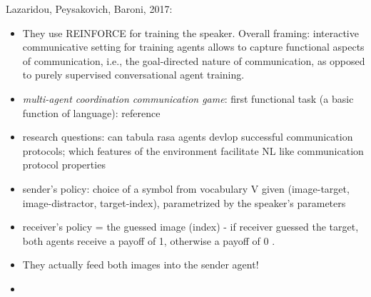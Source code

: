 Lazaridou, Peysakovich, Baroni, 2017:
\begin{itemize}
	\item They use REINFORCE for training the speaker. Overall framing: interactive communicative setting for training agents allows to capture functional aspects of communication, i.e., the goal-directed nature of communication, as opposed to purely supervised conversational agent training. 
	\item \textit{multi-agent coordination communication game}: first functional task (a basic function of language): reference
	\item research questions: can tabula rasa agents devlop successful communication protocols; which features of the environment facilitate NL like communication protocol properties
	\item  sender's policy: choice of a symbol from vocabulary V given (image-target, image-distractor, target-index), parametrized by the speaker's parameters
	\item receiver's policy = the guessed image (index) - if receiver guessed the target, both agents receive a payoff of 1, otherwise a payoff of 0 .
	\item They actually feed both images into the sender agent!
	\item {}

\end{itemize}
